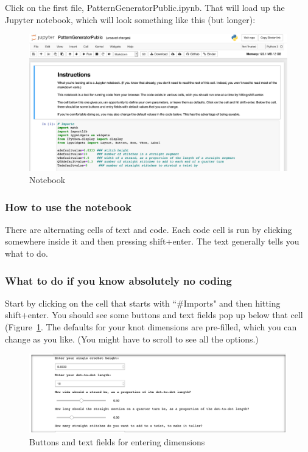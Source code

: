 \documentclass[openany]{book}
\begin{document}
Click on the first file, PatternGeneratorPublic.ipynb.  That will load up the Jupyter notebook, which will look something like this (but longer):

\begin{figure}[H]
\includegraphics[width=\textwidth]{pic/notebook}
\caption{Notebook}
\end{figure}


\subsubsection*{How to use the notebook}
There are alternating cells of text and code. Each code cell is run by clicking somewhere inside it and then pressing shift+enter. The text generally tells you what to do. 

\subsubsection*{What to do if you know absolutely no coding}
Start by clicking on the cell that starts with ``\#Imports" and then hitting shift+enter. You should see some buttons and text fields pop up below that cell (Figure~\ref{fig:defaults}. The defaults for your knot dimensions are pre-filled, which you can change as you like. (You might have to scroll to see all the options.)

\begin{figure}[H]\centering
\includegraphics[width=.75\textwidth]{pic/defaults}
\caption{Buttons and text fields for entering dimensions}\label{fig:defaults}
\end{figure}
\end{document}
